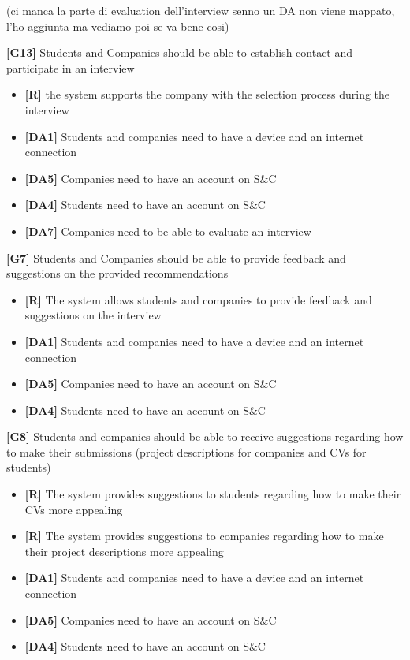 (ci manca la parte di evaluation dell'interview senno un DA non viene mappato, l'ho aggiunta ma vediamo poi se va bene cosi)

\textbf{[G13]} Students and Companies should be able to establish contact and participate in an interview
\begin{itemize}
    \item \textbf{[R]} the system supports the company with the selection process during the interview

    \item \textbf{[DA1]} Students and companies need to have a device and an internet connection
    \item \textbf{[DA5]} Companies need to have an account on S\&C
    \item \textbf{[DA4]} Students need to have an account on S\&C
    \item \textbf{[DA7]} Companies need to be able to evaluate an interview
\end{itemize}

\textbf{[G7]} Students and Companies should be able to provide feedback and suggestions on the provided recommendations
\begin{itemize}
    \item \textbf{[R]} The system allows students and companies to provide feedback and suggestions on
    the interview

    \item \textbf{[DA1]} Students and companies need to have a device and an internet connection
    \item \textbf{[DA5]} Companies need to have an account on S\&C
    \item \textbf{[DA4]} Students need to have an account on S\&C
\end{itemize}

\textbf{[G8]} Students and companies should be able to receive suggestions regarding how to make their submissions (project descriptions for companies and CVs for students)
\begin{itemize}
    \item \textbf{[R]} The system provides suggestions to students regarding how to make their CVs
    more appealing
    \item \textbf{[R]} The system provides suggestions to companies regarding how to make their project
descriptions more appealing
    
    \item \textbf{[DA1]} Students and companies need to have a device and an internet connection
    \item \textbf{[DA5]} Companies need to have an account on S\&C
    \item \textbf{[DA4]} Students need to have an account on S\&C
    
\end{itemize}

